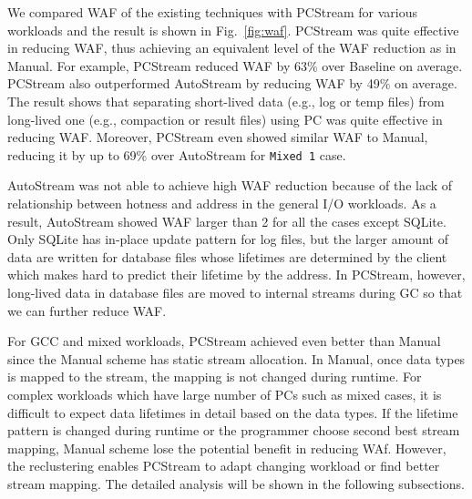 We compared WAF of the existing techniques with \textsf{\small PCStream} for 
various workloads and the result is shown in Fig.~\ref{fig:waf}.  
\textsf{\small PCStream} was quite effective in reducing WAF, 
thus achieving an equivalent level of the WAF reduction as in \textsf{\small Manual}.  
For example, \textsf{\small PCStream}  
reduced WAF by 63\% over \textsf{\small Baseline} on average.
\textsf{\small PCStream} also outperformed \textsf{\small AutoStream} 
by reducing WAF by 49\% on average.
The result shows that separating short-lived data (e.g., log or temp files) 
from long-lived one (e.g., compaction or result files) 
using PC was quite effective in reducing WAF.  
Moreover, \textsf{\small PCStream} even showed similar WAF to \textsf{\small Manual}, 
reducing it by up to 69\% over \textsf{\small AutoStream} for \texttt{Mixed 1} case.

AutoStream was not able to achieve high WAF reduction because of 
the lack of relationship between hotness and address in the general I/O workloads.
As a result, AutoStream showed WAF larger than 2 for all the cases except SQLite.
Only SQLite has in-place update pattern for log files, but the larger amount of data are
written for database files whose lifetimes are determined by the client
which makes hard to predict their lifetime by the address.
In PCStream, however, long-lived data in database files are moved to internal streams
during GC so that we can further reduce WAF.

For GCC and mixed workloads, PCStream achieved even better than Manual
since the Manual scheme has static stream allocation.
In Manual, once data types is mapped to the stream, the mapping is not changed 
during runtime.
For complex workloads which have large number of PCs such as mixed cases,
it is difficult to expect data lifetimes in detail based on the data types.
If the lifetime pattern is changed during runtime or the programmer choose
second best stream mapping,
Manual scheme lose the potential benefit in reducing WAf.
However, the reclustering enables PCStream to adapt changing workload or find
better stream mapping.
The detailed analysis will be shown in the following subsections.

